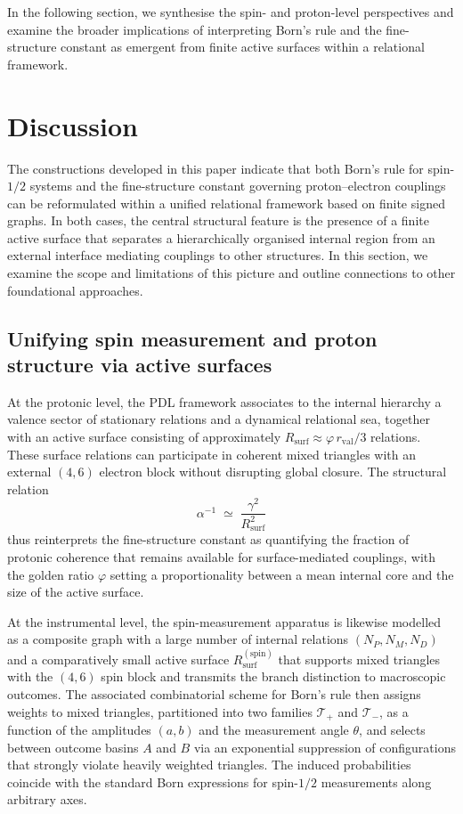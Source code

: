 \documentclass[11pt,a4paper]{article}
\numberwithin{equation}{section}
\begin{document}
In the following section, we synthesise the spin- and proton-level perspectives and examine the broader implications of interpreting Born’s rule and the fine-structure constant as emergent from finite active surfaces within a relational framework.

\section{Discussion}
\label{sec:discussion}

The constructions developed in this paper indicate that both Born’s rule for spin-$1/2$ systems and the fine-structure constant governing proton–electron couplings can be reformulated within a unified relational framework based on finite signed graphs. In both cases, the central structural feature is the presence of a finite active surface that separates a hierarchically organised internal region from an external interface mediating couplings to other structures. In this section, we examine the scope and limitations of this picture and outline connections to other foundational approaches.

\subsection{Unifying spin measurement and proton structure via active surfaces}

At the protonic level, the PDL framework associates to the internal hierarchy a valence sector of stationary relations and a dynamical relational sea, together with an active surface consisting of approximately $R_{\mathrm{surf}}\approx \varphi\,r_{\mathrm{val}}/3$ relations. These surface relations can participate in coherent mixed triangles with an external $(4,6)$ electron block without disrupting global closure. The structural relation
\begin{equation}
  \alpha^{-1} \;\simeq\; \frac{\gamma^2}{R_{\mathrm{surf}}^2}
\end{equation}
thus reinterprets the fine-structure constant as quantifying the fraction of protonic coherence that remains available for surface-mediated couplings, with the golden ratio $\varphi$ setting a proportionality between a mean internal core and the size of the active surface.

At the instrumental level, the spin-measurement apparatus is likewise modelled as a composite graph with a large number of internal relations $(N_P,N_M,N_D)$ and a comparatively small active surface $R_{\mathrm{surf}}^{(\mathrm{spin})}$ that supports mixed triangles with the $(4,6)$ spin block and transmits the branch distinction to macroscopic outcomes. The associated combinatorial scheme for Born’s rule then assigns weights to mixed triangles, partitioned into two families $\mathcal{T}_+$ and $\mathcal{T}_-$, as a function of the amplitudes $(a,b)$ and the measurement angle $\theta$, and selects between outcome basins $A$ and $B$ via an exponential suppression of configurations that strongly violate heavily weighted triangles. The induced probabilities coincide with the standard Born expressions for spin-$1/2$ measurements along arbitrary axes.
\end{document}
